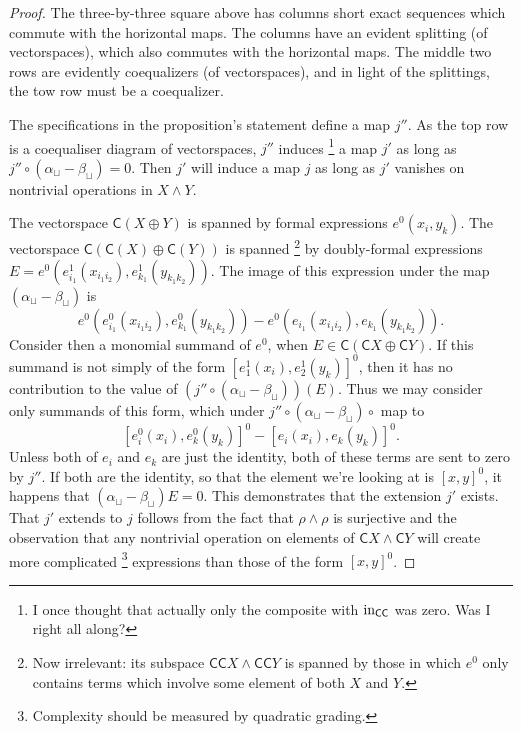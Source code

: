 \documentclass[10pt]{article}
\begin{document}
\begin{Grothendieck Multiplicativity}
\begin{proof}
The three-by-three square above has columns short exact sequences which commute with the horizontal maps. The columns have an evident splitting (of vectorspaces), which also commutes with the horizontal maps. The middle two rows are evidently coequalizers (of vectorspaces), and in light of the splittings, the tow row must be a coequalizer.

The specifications in the proposition's statement define a map $j''$.
As the top row is a coequaliser diagram of vectorspaces, $j''$ induces%
\footnote{I once thought that actually only the composite with $\textup{in}_{\mathsf{C}\mathsf{C}}$ was zero. Was I right all along?} a map $j'$ as long as $j''\circ(\alpha_{\sqcup}-\beta_{\sqcup})=0$. Then $j'$ will induce a map $j$ as long as $j'$ vanishes on nontrivial operations in $X\wedge Y$.

The vectorspace $\mathsf{C}(X\oplus Y)$ is spanned by formal expressions $e^0(x_i,y_k)$. The vectorspace $\mathsf{C}(\mathsf{C}(X)\oplus\mathsf{C}(Y))$ is spanned%
\footnote{Now irrelevant: its subspace $\mathsf{C}\mathsf{C}X\wedge \mathsf{C}\mathsf{C}Y$ is spanned by those in which $e^0$ only contains terms which involve some element of both $X$ and $Y$.} by doubly-formal expressions $E=e^0(e^1_{i_1}(x_{i_1i_2}),e^1_{k_1}(y_{k_1k_2}))$. The image of this expression under the map $(\alpha_{\sqcup}-\beta_{\sqcup})$ is
\[e^0(e^0_{i_1}(x_{i_1i_2}),e^0_{k_1}(y_{k_1k_2}))-e^0(e_{i_1}(x_{i_1i_2}),e_{k_1}(y_{k_1k_2})).\]
Consider then a monomial summand of $e^0$, when $E\in \mathsf{C}(\mathsf{C}X\oplus \mathsf{C}Y)$. If this summand is not simply of the form $[e_1^1(x_i),e_2^1(y_k)]^0$, then it has no contribution to the value of $(j''\circ(\alpha_{\sqcup}-\beta_{\sqcup}))(E)$. Thus we may consider only summands of this form, which under $j''\circ (\alpha_{\sqcup}-\beta_{\sqcup})\circ $ map to
\[[e^0_{i}(x_{i}),e^0_{k}(y_{k})]^0-[e_{i}(x_{i}),e_{k}(y_{k})]^0.\]
Unless both of $e_{i}$ and $e_{k}$ are just the identity, both of these terms are sent to zero by $j''$. If both are the identity, so that the element we're looking at is $[x,y]^0$, it happens that $(\alpha_{\sqcup}-\beta_{\sqcup})E=0$.
This demonstrates that the extension $j'$ exists.
That $j'$ extends to $j$ follows from the fact that $\rho\wedge \rho$ is surjective and the observation that any nontrivial operation on elements of $\mathsf{C}X\wedge \mathsf{C}Y$ will create more complicated%
\footnote{Complexity should be measured by quadratic grading.} expressions than those of the form $[x,y]^0$.
\end{proof}


\end{Grothendieck Multiplicativity}
\end{document}
